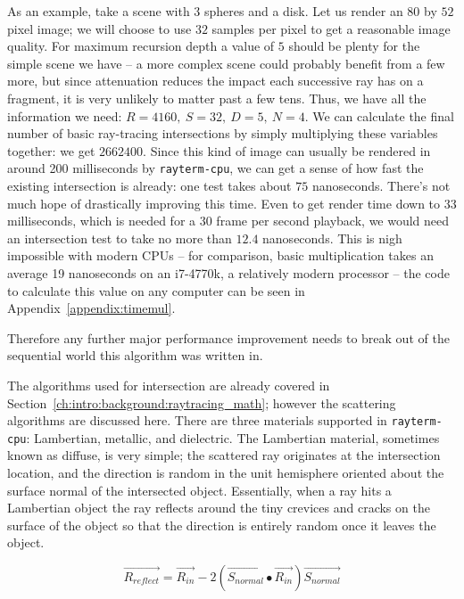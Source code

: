 As an example, take a scene with $3$ spheres and a disk.
Let us render an $80$ by $52$ pixel image;
we will choose to use $32$ samples per pixel to get a reasonable image quality.
For maximum recursion depth a value of $5$ should be plenty for the simple scene we have -- a more complex scene could probably benefit from a few more, but since attenuation reduces the impact each successive ray has on a fragment, it is very unlikely to matter past a few tens.
Thus, we have all the information we need: $R = 4160,\ S = 32,\ D = 5,\ N = 4$.
We can calculate the final number of basic ray-tracing intersections by simply multiplying these variables together: we get $2662400$.
Since this kind of image can usually be rendered in around 200 milliseconds by \texttt{rayterm-cpu}, we can get a sense of how fast the existing intersection is already: one test takes about $75$ nanoseconds.
There's not much hope of drastically improving this time.
Even to get render time down to $33$ milliseconds, which is needed for a $30$ frame per second playback, we would need an intersection test to take no more than $12.4$ nanoseconds.
This is nigh impossible with modern CPUs -- for comparison, basic multiplication takes an average 19 nanoseconds on an i7-4770k, a relatively modern processor -- the code to calculate this value on any computer can be seen in Appendix~\ref{appendix:timemul}.

Therefore any further major performance improvement needs to break out of the sequential world this algorithm was written in.

The algorithms used for intersection are already covered in Section~\ref{ch:intro:background:raytracing_math}; however the scattering algorithms are discussed here.
There are three materials supported in \texttt{rayterm-cpu}: Lambertian, metallic, and dielectric.
The Lambertian material, sometimes known as diffuse, is very simple; the scattered ray originates at the intersection location, and the direction is random in the unit hemisphere oriented about the surface normal of the intersected object.
Essentially, when a ray hits a Lambertian object the ray reflects around the tiny crevices and cracks on the surface of the object so that the direction is entirely random once it leaves the object.

\begin{equation}
  \label{equation:reflection}
  \vec{R_{reflect}} = \vec{R_{in}} - 2(\vec{S_{normal}} \bullet \vec{R_{in}})\vec{S_{normal}}
\end{equation}

